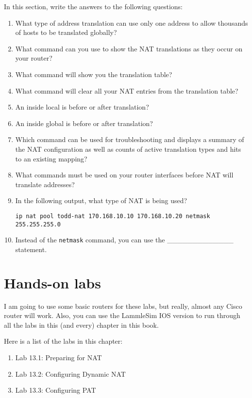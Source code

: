 In this section,
write the answers to the following questions:

\begin{enumerate}
\item
  What type of address translation can use only one address to allow
  thousands of hosts to be translated globally?
\item
  What command can you use to show the NAT translations as they occur on
  your router?
\item
  What command will show you the translation table?
\item
  What command will clear all your NAT entries from the translation
  table?
\item
  An inside local is before or after translation?
\item
  An inside global is before or after translation?
\item
  Which command can be used for troubleshooting and displays a summary
  of the NAT configuration as well as counts of active translation types
  and hits to an existing mapping?
\item
  What commands must be used on your router interfaces before NAT will
  translate addresses?
\item
  In the following output, what type of NAT is being used?

\begin{verbatim}
ip nat pool todd-nat 170.168.10.10 170.168.10.20 netmask 255.255.255.0
\end{verbatim}
\item
  Instead of the \texttt{netmask} command, you can use the
  \_\_\_\_\_\_\_\_\_\_\_\_\_ statement.
\end{enumerate}




\section{Hands-on labs}

I am going to use some basic routers for these labs, but really, almost
any Cisco router will work. Also, you can use the LammleSim IOS version
to run through all the labs in this (and every) chapter in this book.

Here is a list of the labs in this chapter:

\begin{enumerate}
\tightlist
\item
  Lab 13.1: Preparing for NAT
\item
  Lab 13.2: Configuring Dynamic NAT
\item
  Lab 13.3: Configuring PAT
\end{enumerate}

